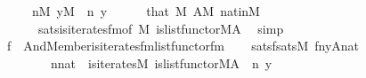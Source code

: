 \begin{isabellebody}
\ \ \ \ \ {\isachardoublequoteopen}n{\isasymin}M{\isachardoublequoteclose}\ {\isachardoublequoteopen}y{\isasymin}M{\isachardoublequoteclose}\ \ n\ y\isanewline
\ \ \ \ \isamarkupfalse%
\ that\ {\isacartoucheopen}{}{\isasymin}M{\isacartoucheclose}\ {\isacartoucheopen}A{\isasymin}M{\isacartoucheclose}\ nat{\isacharunderscore}{\kern0pt}in{\isacharunderscore}{\kern0pt}M\isanewline
\ \ \ \ \ \ sats{\isacharunderscore}{\kern0pt}is{\isacharunderscore}{\kern0pt}iterates{\isacharunderscore}{\kern0pt}fm{\isacharbrackleft}{\kern0pt}of\ M\ {\isachardoublequoteopen}is{\isacharunderscore}{\kern0pt}list{\isacharunderscore}{\kern0pt}functor{\isacharparenleft}{\kern0pt}{\isacharhash}{\kern0pt}{\isacharhash}{\kern0pt}M{\isacharcomma}{\kern0pt}A{\isacharparenright}{\kern0pt}{\isachardoublequoteclose}{\isacharbrackright}{\kern0pt}\ \isamarkupfalse%
\ simp\isanewline
\ \ \isamarkupfalse%
\ {\isacharquery}{\kern0pt}f\ {\isacharequal}{\kern0pt}\ {\isachardoublequoteopen}And{\isacharparenleft}{\kern0pt}Member{\isacharparenleft}{\kern0pt}{}{\isacharcomma}{\kern0pt}{}{\isacharparenright}{\kern0pt}{\isacharcomma}{\kern0pt}is{\isacharunderscore}{\kern0pt}iterates{\isacharunderscore}{\kern0pt}fm{\isacharparenleft}{\kern0pt}list{\isacharunderscore}{\kern0pt}functor{\isacharunderscore}{\kern0pt}fm{\isacharparenleft}{\kern0pt}{}{}{\isacharcomma}{\kern0pt}{}{\isacharcomma}{\kern0pt}{}{\isacharparenright}{\kern0pt}{\isacharcomma}{\kern0pt}{}{\isacharcomma}{\kern0pt}{}{\isacharcomma}{\kern0pt}{}{\isacharparenright}{\kern0pt}{\isacharparenright}{\kern0pt}{\isachardoublequoteclose}\isanewline
\ \ \isamarkupfalse%
\ satsf{\isacharcolon}{\kern0pt}{\isachardoublequoteopen}sats{\isacharparenleft}{\kern0pt}M{\isacharcomma}{\kern0pt}\ {\isacharquery}{\kern0pt}f{\isacharcomma}{\kern0pt}{\isacharbrackleft}{\kern0pt}n{\isacharcomma}{\kern0pt}y{\isacharcomma}{\kern0pt}A{\isacharcomma}{\kern0pt}{}{\isacharcomma}{\kern0pt}nat{\isacharbrackright}{\kern0pt}\ {\isacharparenright}{\kern0pt}\ {\isasymlongleftrightarrow}\isanewline
\ \ \ \ \ \ \ \ n{\isasymin}nat\ {\isacharampersand}{\kern0pt}\ is{\isacharunderscore}{\kern0pt}iterates{\isacharparenleft}{\kern0pt}{\isacharhash}{\kern0pt}{\isacharhash}{\kern0pt}M{\isacharcomma}{\kern0pt}\ is{\isacharunderscore}{\kern0pt}list{\isacharunderscore}{\kern0pt}functor{\isacharparenleft}{\kern0pt}{\isacharhash}{\kern0pt}{\isacharhash}{\kern0pt}M{\isacharcomma}{\kern0pt}A{\isacharparenright}{\kern0pt}{\isacharcomma}{\kern0pt}\ {}{\isacharcomma}{\kern0pt}\ n{\isacharcomma}{\kern0pt}\ y{\isacharparenright}{\kern0pt}{\isachardoublequoteclose}\isanewline

\end{isabellebody}
